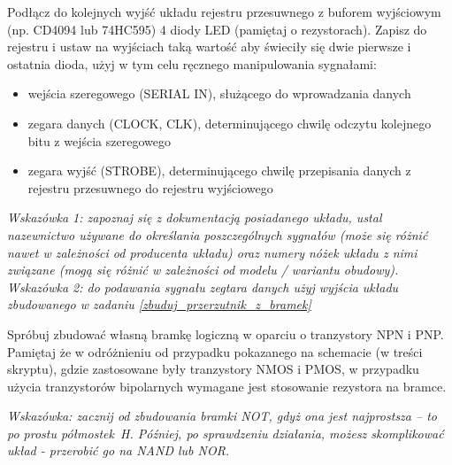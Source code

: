 \vspace{2mm}\noindent{}
\fi

\dbEntryCheckResults
Podłącz do kolejnych wyjść układu rejestru przesuwnego z buforem wyjściowym (np. CD4094 lub 74HC595) 4 diody LED (pamiętaj o rezystorach).
Zapisz do rejestru i ustaw na wyjściach taką wartość aby świeciły się dwie pierwsze i ostatnia dioda, użyj w tym celu ręcznego manipulowania sygnałami:
\begin{itemize}
\item wejścia szeregowego (SERIAL IN), służącego do wprowadzania danych
\item zegara danych (CLOCK, CLK), determinującego chwilę odczytu kolejnego bitu z wejścia szeregowego
\item zegara wyjść (STROBE), determinującego chwilę przepisania danych z rejestru przesuwnego do rejestru wyjściowego
\end{itemize}

\textit{Wskazówka 1: zapoznaj się z dokumentacją posiadanego układu, ustal nazewnictwo używane do określania poszczególnych sygnałów (może się różnić nawet w zależności od producenta układu) oraz numery nóżek układu z nimi związane (mogą się różnić w zależności od modelu / wariantu obudowy).}
\textit{Wskazówka 2: do podawania sygnału zegtara danych użyj wyjścia układu zbudowanego w zadaniu \ref{zbuduj_przerzutnik_z_bramek}}
\fi

\dbEntryCheckResults
Spróbuj zbudować własną bramkę logiczną w oparciu o tranzystory NPN i PNP. Pamiętaj że w odróżnieniu od przypadku pokazanego na schemacie (w treści skryptu), gdzie zastosowane były tranzystory NMOS i PMOS, w przypadku użycia tranzystorów bipolarnych wymagane jest stosowanie rezystora na bramce.

\textit{Wskazówka: zacznij od zbudowania bramki NOT, gdyż ona jest najprostsza – to po prostu półmostek H. Później, po sprawdzeniu działania, możesz skomplikować układ - przerobić go na NAND lub NOR.}
\fi
